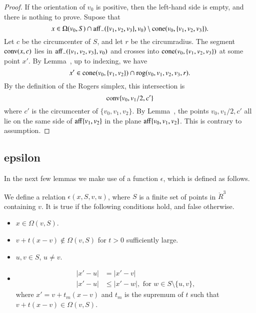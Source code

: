\begin{proof}  If the orientation of $v_0$ is positive,
then the left-hand side is empty, and there is nothing to prove.
Supose that 
 $$x\in
   \Omega(v_0,S) \cap {\operatorname{aff}}_-(\{v_1,v_2,v_3\},v_0)
   \setminus
  {\operatorname{cone}}(v_0,\{v_1,v_2,v_3\}).
 $$
Let $c$ be the circumcenter of $S$, and let $r$ be the
circumradius.  The segment ${\operatorname{conv}}(x,c)$
lies in ${\operatorname{aff}}_-(\{v_1,v_2,v_3\},v_0)$ and crosses into
${\operatorname{cone}}(v_0,\{v_1,v_2,v_3\})$ at some point $x'$.  
By Lemma~, up to indexing,
we have 
  $$x'\in{\operatorname{cone}}(v_0,\{v_1,v_2\})\cap{\operatorname{rog}}(v_0,v_1,v_2,v_3,r).$$
By the definition of the Rogers simplex, this intersection is
  $${\operatorname{conv}}\{v_0,v_1/2,c'\}$$
where $c'$ is the circumcenter of $\{v_0,v_1,v_2\}$.
By Lemma~, the points $v_0,v_1/2,c'$ all lie
on the same side of ${\operatorname{aff}}\{v_1,v_2\}$ in the plane ${\operatorname{aff}}\{v_0,v_1,v_2\}$.  This is contrary to assumption.
\end{proof}
\newpage

\subsection{epsilon}

In the next few lemmas we make use of a function
$\epsilon$, which is defined as follows.

\begin{definition}[$\epsilon$]
We define a relation $\epsilon(x,S,v,u)$, where $S$ is
a finite set of points in $\ring{R}^3$ containing $v$.  It is true if
the following conditions hold, and false otherwise.
\begin{itemize}
 \item $x\in \Omega(v,S)$.
 \item $v + t(x-v)\not\in\Omega(v,S)$ for
$t>0$ sufficiently large.
  \item $u,v\in S$, $u\ne v$.
 \item \begin{equation}\label{fine:eps-test}
     \begin{array}{lll}
   |x'-u| &= |x'-v|\\
   |x'-u| &\le |x'-w|,\text{ for } w\in S\setminus\{u,v\},
   \end{array}
   \end{equation}
  where $x' = v+t_m (x-v)$ and $t_m$ is the supremum of $t$
  such that $v+t(x-v)\in\Omega(v,S)$.
\end{itemize}
\end{definition}

